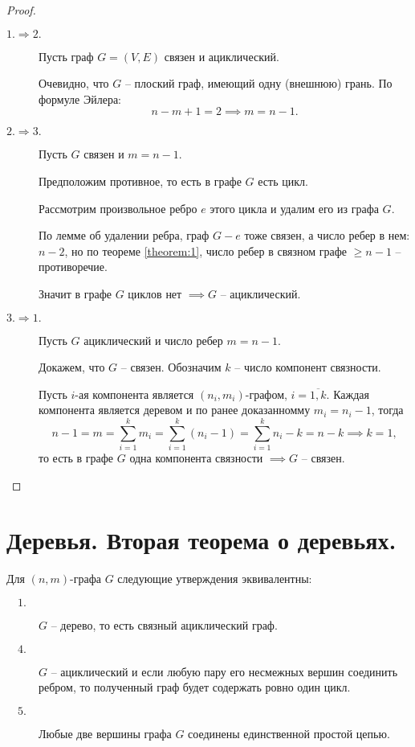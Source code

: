 \begin{proof}\leavevmode
    \begin{description}
        \item[$ \boxed{1. \Rightarrow 2.} $] Пусть граф $ G = (V,E) $ связен и ациклический.

              Очевидно, что $ G $ -- плоский граф, имеющий одну (внешнюю) грань. По формуле Эйлера:
              \[
                  n-m+1=2 \implies m = n-1.
              \]

        \item[$ \boxed{2. \Rightarrow 3.} $] Пусть $ G $ связен и $ m = n-1 $.

              Предположим противное, то есть в графе $ G $ есть цикл.

              Рассмотрим произвольное ребро $ e $ этого цикла и удалим его из графа $ G $.

              По лемме об удалении ребра, граф $ G - e $ тоже связен, а число ребер в нем: $ n-2 $, но по теореме \ref{theorem:1}, число ребер в связном графе $ \geqslant n-1 $ -- противоречие.

              Значит в графе $ G $ циклов нет $ \implies G $ -- ациклический.

              \newpage

        \item[$ \boxed{3. \Rightarrow 1.} $] Пусть $ G $ ациклический и число ребер $ m = n - 1 $.

              Докажем, что $ G $ -- связен. Обозначим $ k $ -- число компонент связности.

              Пусть $ i $-ая компонента является $ (n_i,m_i) $-графом, $ i = \overline{1,k} $. Каждая компонента является деревом и по ранее доказанномму $ m_i = n_i - 1 $, тогда
              \[
                  n-1 = m = \sum_{i=1}^{k}m_i = \sum_{i=1}^{k}(n_i-1)=\sum_{i=1}^{k}n_i - k = n - k \implies \boxed{k = 1},
              \]
              то есть в графе $ G $ одна компонента связности $ \implies G $ -- связен.
    \end{description}
\end{proof}

\section{Деревья. Вторая теорема о деревьях.}

\begin{theorem}
    Для $ (n,m) $-графа $ G $ следующие утверждения эквивалентны:
    \begin{description}
        \item[$ \quad 1. $] $ G $ -- дерево, то есть связный ациклический граф.
        \item[$ \quad 4. $] $ G $ -- ациклический и если любую пару его несмежных вершин соединить ребром, то полученный граф будет содержать ровно один цикл.
        \item[$ \quad 5. $] Любые две вершины графа $ G $ соединены единственной простой цепью.
    \end{description}
\end{theorem}

